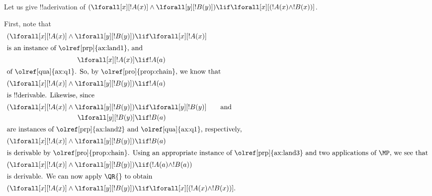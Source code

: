 \documentclass[../../../include/open-logic-section]{subfiles}
\begin{document}


\begin{ex}
Let us give !!a{derivation} of $(\lforall[x][!A(x)] \land
\lforall[y][!B(y)]) \lif \lforall[x][(!A(x) \land !B(x))]$.

First, note that
\begin{align*}
  (\lforall[x][!A(x)] \land \lforall[y][!B(y)]) & \lif \lforall[x][!A(x)]\\
  \intertext{is an instance of \olref[prp]{ax:land1}, and}
  \lforall[x][!A(x)] & \lif !A(a) \\
  \intertext{of \olref[qua]{ax:q1}. So, by \olref[pro]{prop:chain}, we know that}
  (\lforall[x][!A(x)] \land \lforall[y][!B(y)]) & \lif !A(a) \\
  \intertext{is !!{derivable}. Likewise, since}
  (\lforall[x][!A(x)] \land \lforall[y][!B(y)]) & \lif \lforall[y][!B(y)] \qquad\text{and}\\
    \lforall[y][!B(y)] & \lif !B(a)\\
    \intertext{are instances of \olref[prp]{ax:land2} and \olref[qua]{ax:q1}, respectively,}
    (\lforall[x][!A(x)] \land \lforall[y][!B(y)]) & \lif !B(a)\\
    \intertext{is derivable by \olref[pro]{prop:chain}. Using an appropriate instance of \olref[prp]{ax:land3} and two applications of~\MP, we see that}
    (\lforall[x][!A(x)] \land \lforall[y][!B(y)]) & \lif (!A(a) \land !B(a))\\
    \intertext{is derivable. We can now apply \QR{} to obtain}
(\lforall[x][!A(x)] \land \lforall[y][!B(y)]) & \lif \lforall[x][(!A(x) \land !B(x))].
\end{align*}
\end{ex}
\end{document}
